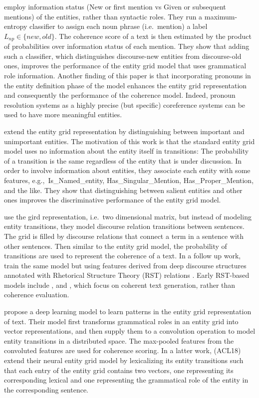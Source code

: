  employ information status (New or first mention vs Given or subsequent mentions) of the entities, rather than syntactic roles. 
They run a maximum-entropy classifier to assign each noun phrase (i.e.\ mention) a label $L_{np} \in \lbrace new, old \rbrace$. 
The coherence score of a text is then estimated by the product of probabilities over information status of each mention. 
They show that adding such a classifier, which distinguishes discourse-new entities from discourse-old ones, improves the performance of the entity grid model that uses grammatical role information.  
Another finding of this paper is that incorporating pronouns in the entity definition phase of the model enhances the entity grid representation and consequently the performance of the coherence model. 
Indeed, pronoun resolution systems as a highly precise (but specific) coreference systems can be used to have more meaningful entities. 

 extend the entity grid representation by distinguishing between important and unimportant entities. 
The motivation of this work is that the standard entity grid model uses no information about the entity itself in transitions: The probability of a transition is the same regardless of the entity that is under discussion. 
In order to involve information about entities, they associate each entity with some features, e.g.,\ Is\_Named\_entity, Has\_Singular\_Mention, Has\_Proper\_Mention, and the like. 
They show that distinguishing between salient entities and other ones improves the discriminative performance of the entity grid model. 

 use the gird representation, i.e.\ two dimensional matrix, but instead of modeling entity transitions, they model discourse relation transitions between sentences. 
The grid is filled by discourse relations that connect a term in a sentence with other sentences. 
Then similar to the entity grid model, the probability of transitions are used to represent the coherence of a text. 
In a follow up work,  train the same model but using features derived from deep discourse structures annotated with Rhetorical Structure Theory (RST) relations \cite{mann88,prasad08a}. 
Early RST-based models include , and , which focus on coherent text generation, rather than coherence evaluation.

 propose a deep learning model to learn patterns in the entity grid representation of text. 
Their model first transforms grammatical roles in an entity grid into vector representations, and then supply them to a convolution operation to model entity transitions in a distributed space. 
The max-pooled features from the convoluted features are used for coherence scoring. 
In a latter work,  (ACL18) extend their neural entity grid model by lexicalizing its entity transitions such that each entry of the entity grid contains two vectors, one representing its corresponding lexical and one representing the grammatical role of the entity in the corresponding sentence.  

